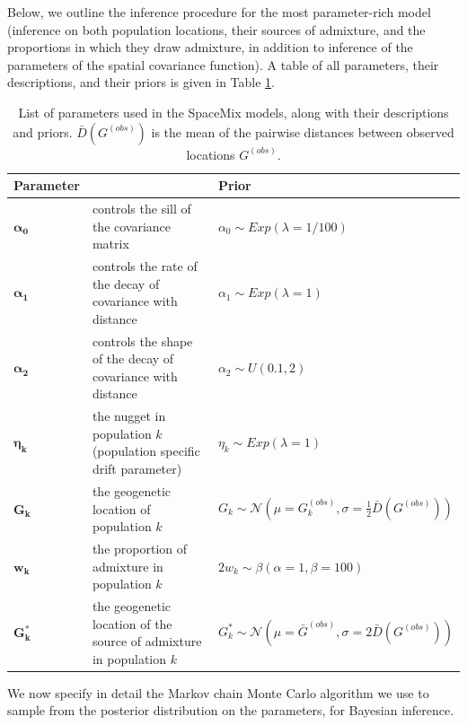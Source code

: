 \documentclass[10pt,letterpaper]{article}
\newcommand{\identifyadmixsource}[1]{{#1^{*}}}
\begin{document}
Below, we outline the inference procedure for the most parameter-rich model (inference on both population locations, their sources of admixture, and the proportions in which they draw admixture, in addition to inference of the parameters of the spatial covariance function).
A table of all parameters, their descriptions, and their priors is given in Table \ref{tab:param_prior_tab}.

\begin{centering}
\begin{table}
\begin{tabular}{| >{\centering\arraybackslash}m{1.7cm} | m{4.8cm} | >{\centering\arraybackslash}m{6.2cm} |}
	\hline
	\textbf{Parameter} & \centering{\textbf{Description}} & \textbf{Prior}\\ \hline
	$\boldsymbol{\alpha_0}$ & 
		controls the sill of the covariance matrix & 
		$\alpha_0 \sim Exp(\lambda = 1/100)$\\ \hline
	$\boldsymbol{\alpha_1}$ & 
		controls the rate of the decay of covariance with distance & 
		$\alpha_1 \sim Exp(\lambda = 1)$\\ \hline
	$\boldsymbol{\alpha_2}$ & 
		controls the shape of the decay of covariance with distance & 
		$\alpha_2 \sim U(0.1,2)$\\ \hline
	$\boldsymbol{\eta_k}$ & 
		the nugget in population $k$ (population specific drift parameter)  & 
		$\eta_k \sim Exp(\lambda = 1)$\\ \hline
	$\boldsymbol{G_k}$ & 
		the geogenetic location of population $k$ &
		 $G_k \sim \mathcal{N}(\mu = G^{(obs)}_k,\sigma = \frac{1}{2}\bar{D}(G^{(obs)}))$ \\ \hline
	$\boldsymbol{w_k}$ &
		the proportion of admixture in population $k$ &
		$2 w_k \sim \beta(\alpha = 1,\beta = 100)$  \\ \hline
	$\boldsymbol{\identifyadmixsource{G_k}}$ &
		the geogenetic location of the source of admixture in population $k$ &
		$\identifyadmixsource{G_k} \sim \mathcal{N}(\mu = \bar{G}^{(obs)},\sigma = 2 \bar{D}(G^{(obs)}))$ \\
	\hline
\end{tabular}
\caption{
List of parameters used in the SpaceMix models, along with their descriptions and priors.
$\bar{D}(G^{(obs)})$ is the mean of the pairwise distances between observed locations $G^{(obs)}$.
}\label{tab:param_prior_tab}
\end{table}
\end{centering}

We now specify in detail the Markov chain Monte Carlo algorithm we use to sample from the posterior distribution on the parameters,
for Bayesian inference.
\end{document}
